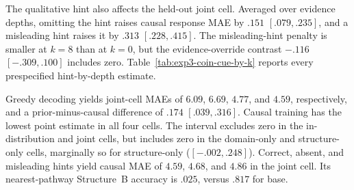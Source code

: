 \begin{center}
\begin{minipage}{\linewidth}
\centering
{}
\label{tab:exp3-coin-stochastic}
\scriptsize
\setlength{\tabcolsep}{2.5pt}
\resizebox{\linewidth}{!}{}
\end{minipage}
\end{center}

The qualitative hint also affects the held-out joint cell. Averaged over evidence
depths, omitting the hint raises causal response MAE by $.151$ $[.079,.235]$,
and a misleading hint raises it by $.313$ $[.228,.415]$. The misleading-hint
penalty is smaller at $k=8$ than at $k=0$, but the evidence-override contrast
$-.116$ $[-.309,.100]$ includes zero. Table~\ref{tab:exp3-coin-cue-by-k}
reports every prespecified hint-by-depth estimate.

\begin{center}
\begin{minipage}{\linewidth}
\centering
{}
\label{tab:exp3-coin-cue-by-k}
\scriptsize
\setlength{\tabcolsep}{2.2pt}
\resizebox{\linewidth}{!}{}
\end{minipage}
\end{center}

Greedy decoding yields joint-cell MAEs of $6.09$, $6.69$, $4.77$, and $4.59$,
respectively, and a prior-minus-causal difference of $.174$ $[.039,.316]$. Causal
training has the lowest point estimate in all four cells. The interval excludes
zero in the in-distribution and joint cells, but includes zero in the domain-only
and structure-only cells, marginally so for structure-only ($[-.002,.248]$).
Correct, absent, and misleading hints yield causal MAE of $4.59$, $4.68$, and
$4.86$ in the joint cell. Its nearest-pathway Structure~B accuracy is $.025$,
versus $.817$ for base.

\begin{center}
\begin{minipage}{\linewidth}
\centering
{}
\label{tab:exp3-coin-greedy}
\scriptsize
\setlength{\tabcolsep}{2.5pt}
\resizebox{\linewidth}{!}{}
\end{minipage}
\end{center}

